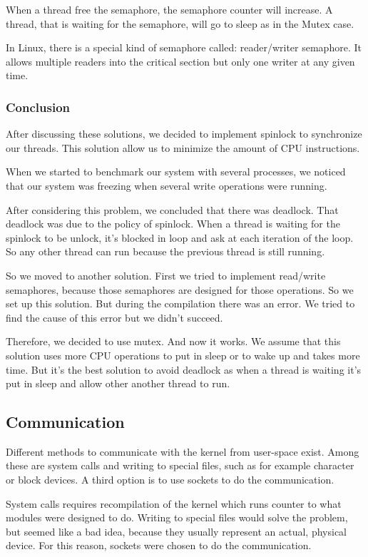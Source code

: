 \documentclass[final,a4paper]{article}
\begin{document}
When a thread free the semaphore, the semaphore counter will increase.
A thread, that is waiting for the semaphore, will go to sleep as in the Mutex
case.

In Linux, there is a special kind of semaphore called: reader/writer semaphore.
It allows multiple readers into the critical section but only one writer at any
given time.

\subsubsection*{Conclusion}
After discussing these solutions, we decided to implement spinlock to
synchronize our threads. This solution allow us to minimize the amount of CPU
instructions.

When we started to benchmark our system with several processes, we noticed that
our system was freezing when several write operations were running.

After considering this problem, we concluded that there was deadlock. That
deadlock was due to the policy of spinlock. When a thread is waiting for the
spinlock to be unlock, it’s blocked in loop and ask at each iteration of the
loop. So any other thread can run because the previous thread is still running.

So we moved to another solution. First we tried to implement read/write
semaphores, because those semaphores are designed for those operations. So we
set up this solution. But during the compilation there was an error. We tried
to find the cause of this error but we didn’t succeed.

Therefore, we decided to use mutex. And now it works. We assume that this
solution uses more CPU operations to put in sleep or to wake up and takes more
time. But it’s the best solution to avoid deadlock as when a thread is waiting
it’s put in sleep and allow other another thread to run.

\subsection{Communication}
Different methods to communicate with the kernel from user-space exist. Among
these are system calls and writing to special files, such as for example
character or block devices. A third option is to use sockets to do the
communication.

System calls requires recompilation of the kernel which runs counter to what
modules were designed to do. Writing to special files would solve the problem,
but seemed like a bad idea, because they usually represent an actual, physical
device. For this reason, sockets were chosen to do the communication.
\end{document}

